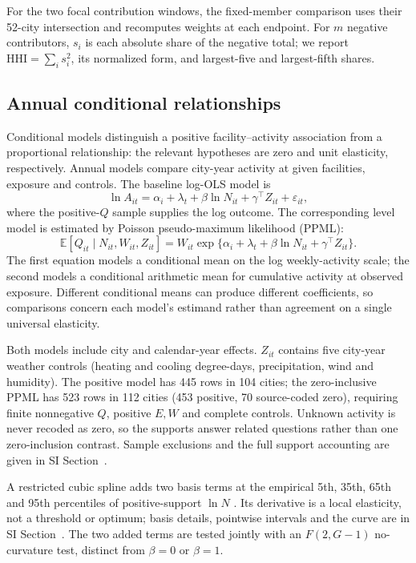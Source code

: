 For the two focal contribution windows, the fixed-member comparison uses their 52-city intersection and recomputes weights at each endpoint. For $m$ negative contributors, $s_i$ is each absolute share of the negative total; we report $\mathrm{HHI}=\sum_i s_i^2$, its normalized form, and largest-five and largest-fifth shares.

\subsection{Annual conditional relationships}
Conditional models distinguish a positive facility--activity association from a proportional relationship: the relevant hypotheses are zero and unit elasticity, respectively. Annual models compare city-year activity at given facilities, exposure and controls. The baseline log-OLS model is
\begin{equation}
 \ln A_{it}=\alpha_i+\lambda_t+\beta\ln N_{it}+\gamma^{\top}Z_{it}+\varepsilon_{it},
 \label{eq:ols}
\end{equation}
where the positive-$Q$ sample supplies the log outcome.  The corresponding level model is estimated by Poisson pseudo-maximum likelihood (PPML):
\begin{equation}
 \mathbb{E}[Q_{it}\mid N_{it},W_{it},Z_{it}]
 =W_{it}\exp\{\alpha_i+\lambda_t+\beta\ln N_{it}+\gamma^{\top}Z_{it}\}.
 \label{eq:ppml}
\end{equation}
The first equation models a conditional mean on the log weekly-activity scale; the second models a conditional arithmetic mean for cumulative activity at observed exposure.  Different conditional means can produce different coefficients, so comparisons concern each model's estimand rather than agreement on a single universal elasticity.

Both models include city and calendar-year effects.  $Z_{it}$ contains five city-year weather controls (heating and cooling degree-days, precipitation, wind and humidity).  The positive model has 445 rows in 104 cities; the zero-inclusive PPML has 523 rows in 112 cities (453 positive, 70 source-coded zero), requiring finite nonnegative $Q$, positive $E,W$ and complete controls.  Unknown activity is never recoded as zero, so the supports answer related questions rather than one zero-inclusion contrast. Sample exclusions and the full support accounting are given in SI Section~.

A restricted cubic spline adds two basis terms at the empirical 5th, 35th, 65th and 95th percentiles of positive-support $\ln N$ \citep{harrell2015}.  Its derivative is a local elasticity, not a threshold or optimum; basis details, pointwise intervals and the curve are in SI Section~.  The two added terms are tested jointly with an $F(2,G-1)$ no-curvature test, distinct from $\beta=0$ or $\beta=1$.

